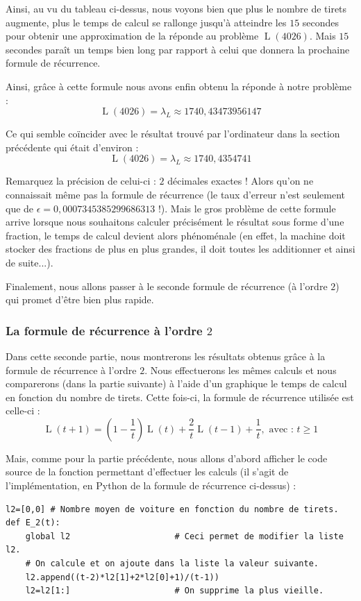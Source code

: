 \documentclass[a4paper,francais,11pt]{article}
\begin{document}
Ainsi, au vu du tableau ci-dessus, nous voyons bien que plus le nombre de tirets augmente, plus le temps de calcul se rallonge jusqu'à atteindre les $15$ secondes pour obtenir une approximation de la réponde au problème $\operatorname{L}\left(4026\right)$. Mais $15$ secondes paraît un temps bien long par rapport à celui que donnera la prochaine formule de récurrence.

Ainsi, grâce à cette formule nous avons enfin obtenu la réponde à notre problème :
\[\operatorname{L}\left(4026\right)=\lambda_L\approx 1740{,}43473956147\]

Ce qui semble coïncider avec le résultat trouvé par l'ordinateur dans la section précédente qui était d'environ :
\[\operatorname{L}\left(4026\right)=\lambda_L\approx1740{,}4354741\]

Remarquez la précision de celui-ci : $2$ décimales exactes ! Alors qu'on ne connaissait même pas la formule de récurrence (le taux d'erreur n'est seulement que de $\epsilon = 0{,}0007345385299686313$ !). Mais le gros problème de cette formule arrive lorsque nous souhaitons calculer précisément le résultat sous forme d'une fraction, le temps de calcul devient alors phénoménale (en effet, la machine doit stocker des fractions de plus en plus grandes, il doit toutes les additionner et ainsi de suite...).

Finalement, nous allons passer à le seconde formule de récurrence (à l'ordre $2$) qui promet d'être bien plus rapide.
\subsubsection{La formule de récurrence à l'ordre $2$}
Dans cette seconde partie, nous montrerons les résultats obtenus grâce à la formule de récurrence à l'ordre $2$. Nous effectuerons les mêmes calculs et nous comparerons (dans la partie suivante) à l'aide d'un graphique le temps de calcul en fonction du nombre de tirets. Cette fois-ci, la formule de récurrence utilisée est celle-ci :
\[\operatorname{L}\left(t+1\right)=\left(1-\frac{1}{t}\right)\operatorname{L}\left(t\right)+\frac{2}{t}\operatorname{L}\left(t-1\right)+\frac{1}{t},\text{ avec : $t\geqslant1$}\]

Mais, comme pour la partie précédente, nous allons d'abord afficher le code source de la fonction permettant d'effectuer les calculs (il s'agit de l'implémentation, en Python de la formule de récurrence ci-dessus) :
\begin{center}
\begin{verbatim}
l2=[0,0] # Nombre moyen de voiture en fonction du nombre de tirets.
def E_2(t):
    global l2                     # Ceci permet de modifier la liste l2.
    # On calcule et on ajoute dans la liste la valeur suivante.
    l2.append((t-2)*l2[1]+2*l2[0]+1)/(t-1)) 
    l2=l2[1:]                     # On supprime la plus vieille.
\end{verbatim}
\end{center}
\end{document}
